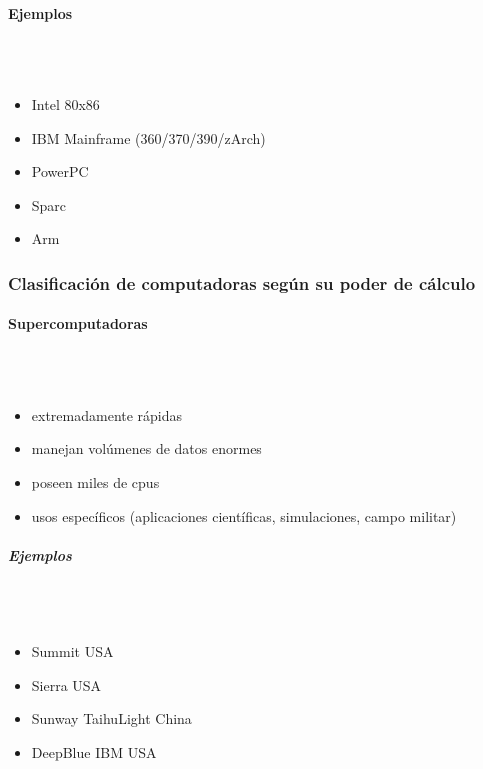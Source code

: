 \paragraph{Ejemplos}\mbox{}\\\\
\begin{itemize}
\item Intel 80x86
\item IBM Mainframe (360/370/390/zArch)
\item PowerPC
\item Sparc
\item Arm
\end{itemize}

\subsubsection{Clasificación de computadoras según su poder de cálculo}

\paragraph{Supercomputadoras}\mbox{}\\\\%
\begin{itemize}
\item extremadamente rápidas
\item manejan volúmenes de datos enormes
\item poseen miles de cpus
\item usos específicos (aplicaciones científicas, simulaciones, campo militar)
\end{itemize}

\subparagraph{Ejemplos}\mbox{}\\\\
\begin{itemize}
\item Summit USA
\item Sierra USA
\item Sunway TaihuLight China
\item DeepBlue IBM USA
\end{itemize}

